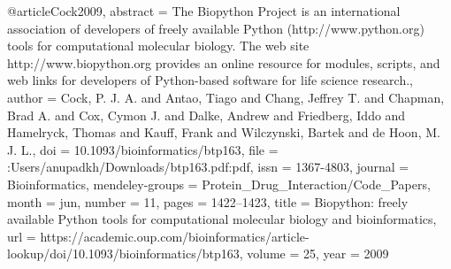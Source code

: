 @article{Cock2009,
abstract = {The Biopython Project is an international association of developers of freely available Python (http://www.python.org) tools for computational molecular biology. The web site http://www.biopython.org provides an online resource for modules, scripts, and web links for developers of Python-based software for life science research.},
author = {Cock, P. J. A. and Antao, Tiago and Chang, Jeffrey T. and Chapman, Brad A. and Cox, Cymon J. and Dalke, Andrew and Friedberg, Iddo and Hamelryck, Thomas and Kauff, Frank and Wilczynski, Bartek and de Hoon, M. J. L.},
doi = {10.1093/bioinformatics/btp163},
file = {:Users/anupadkh/Downloads/btp163.pdf:pdf},
issn = {1367-4803},
journal = {Bioinformatics},
mendeley-groups = {Protein{\_}Drug{\_}Interaction/Code{\_}Papers},
month = {jun},
number = {11},
pages = {1422--1423},
title = {{Biopython: freely available Python tools for computational molecular biology and bioinformatics}},
url = {https://academic.oup.com/bioinformatics/article-lookup/doi/10.1093/bioinformatics/btp163},
volume = {25},
year = {2009}
}

